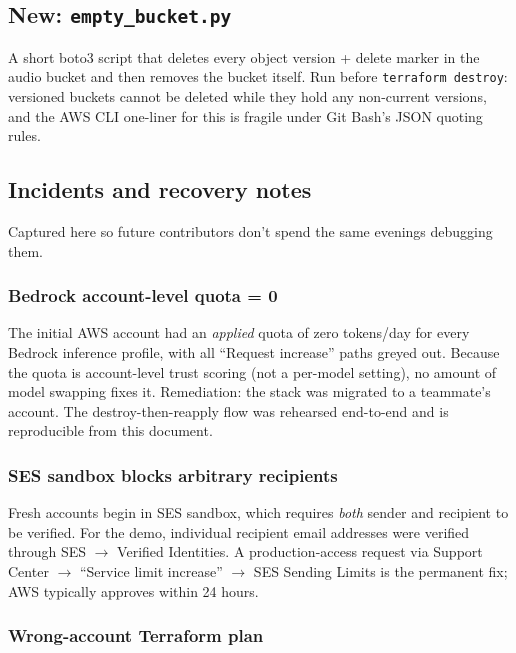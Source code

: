 \documentclass[11pt,a4paper]{article}
\begin{document}
\subsection{New: \texttt{empty\_bucket.py}}

A short boto3 script that deletes every object version + delete marker
in the audio bucket and then removes the bucket itself. Run before
\texttt{terraform destroy}: versioned buckets cannot be deleted while
they hold any non-current versions, and the AWS CLI one-liner for this
is fragile under Git Bash's JSON quoting rules.

\subsection{Incidents and recovery notes}

Captured here so future contributors don't spend the same evenings
debugging them.

\subsubsection*{Bedrock account-level quota = 0}

The initial AWS account had an \emph{applied} quota of zero tokens/day
for every Bedrock inference profile, with all ``Request increase'' paths
greyed out. Because the quota is account-level trust scoring (not a
per-model setting), no amount of model swapping fixes it. Remediation:
the stack was migrated to a teammate's account. The destroy-then-reapply
flow was rehearsed end-to-end and is reproducible from this document.

\subsubsection*{SES sandbox blocks arbitrary recipients}

Fresh accounts begin in SES sandbox, which requires \emph{both} sender
and recipient to be verified. For the demo, individual recipient email
addresses were verified through SES $\to$ Verified Identities. A
production-access request via Support Center $\to$ ``Service limit
increase'' $\to$ SES Sending Limits is the permanent fix; AWS typically
approves within 24 hours.

\subsubsection*{Wrong-account Terraform plan}
\end{document}

